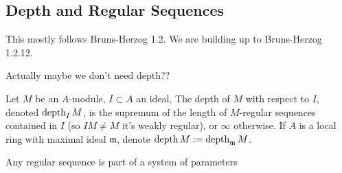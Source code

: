 \begin{comment}
\begin{lemma}
  \label{lem:assoc_iff_minimal_in_support}
  \uses{prop:assoc_primes_in_support}
  The assocated primes of $M$ are precisely
  the primes which are minimal in the support of $M$.
\end{lemma}


\begin{lemma}
  \label{lem:assoc_prime_zero_divisor}
  \uses{thm:first_uniqueness_primary_decomposition}
  An element $x \in R$ is a zero-divisor iff
  it is in an associated prime.
  (geometrically, it vanishes at an associated point)
\end{lemma}

\end{comment}



\subsection{Depth and Regular Sequences}

This mostly follows Bruns-Herzog 1.2.
We are building up to Bruns-Herzog 1.2.12.

Actually maybe we don't need depth??

\begin{definition}
  \label{def:depth}
	Let $M$ be an $A$-module, $I \subset A$ an ideal, The depth of $M$ with respect to $I$, denoted $\operatorname{depth}_I M$, is the supremum of the length of $M$-regular sequences contained in $I$ (so $IM \neq M$ it's weakly regular), or $\infty$ otherwise.
	If $A$ is a local ring with maximal ideal $\mathfrak{m}$, denote $\operatorname{depth} M := \operatorname{depth}_\mathfrak{m}M$.
\end{definition}

\begin{theorem}[BH 1.2.12]
  \label{thm:reg_seq_part_of_sys_param}
  Any regular sequence is part of a system of parameters
\end{theorem}

